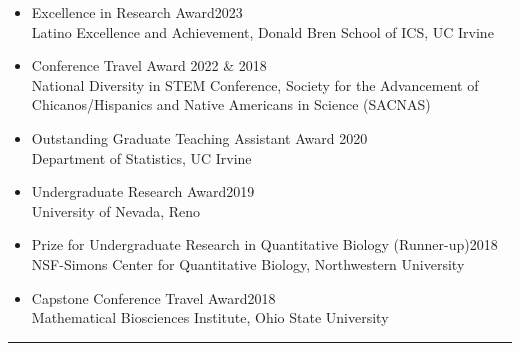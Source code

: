 \documentclass{article}
\begin{document}
	
	\begin{description}
		\vspace{-2mm}
		\item[Awards]\hspace*{.1in}
		
		\begin{itemize}
			\item Excellence in Research Award\hfill{2023}\\
			Latino Excellence and Achievement, Donald Bren School of ICS, UC Irvine
			
			\item Conference Travel Award \hfill{2022 \& 2018}\\
			National Diversity in STEM Conference, Society for the Advancement of Chicanos/Hispanics and Native Americans in Science (SACNAS)
			\vspace*{1mm}
			
			\item Outstanding Graduate Teaching Assistant Award \hfill{2020}\\ 
			Department of Statistics, UC Irvine
			
			\item Undergraduate Research Award\hfill{2019}\\
			University of Nevada, Reno
			
			\item Prize for Undergraduate Research in Quantitative Biology (Runner-up)\hfill{2018}\\
			NSF-Simons Center for Quantitative Biology, Northwestern University
			
			\item Capstone Conference Travel Award\hfill{2018}\\
			Mathematical Biosciences Institute, Ohio State University
		\end{itemize}
	\end{description}
	\vspace{-2mm}
	\rule{\linewidth}{1pt}
	
	
	
\end{document}
